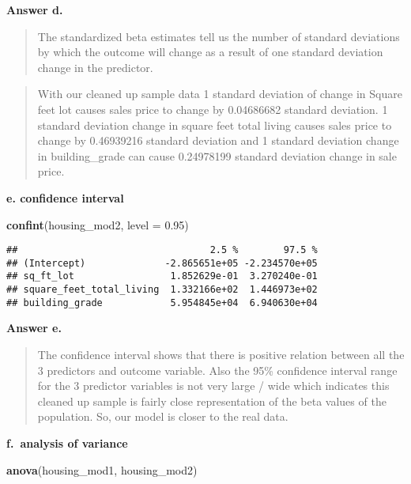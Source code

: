 \documentclass[
]{article}
\newenvironment{Shaded}{\begin{snugshade}}{\end{snugshade}}
\newcommand{\DataTypeTok}[1]{\textcolor[rgb]{0.13,0.29,0.53}{#1}}
\newcommand{\FloatTok}[1]{\textcolor[rgb]{0.00,0.00,0.81}{#1}}
\newcommand{\KeywordTok}[1]{\textcolor[rgb]{0.13,0.29,0.53}{\textbf{#1}}}
\newcommand{\NormalTok}[1]{#1}
\begin{document}
\textbf{Answer d.~}

\begin{quote}
The standardized beta estimates tell us the number of standard
deviations by which the outcome will change as a result of one standard
deviation change in the predictor.
\end{quote}

\begin{quote}
With our cleaned up sample data 1 standard deviation of change in Square
feet lot causes sales price to change by 0.04686682 standard deviation.
1 standard deviation change in square feet total living causes sales
price to change by 0.46939216 standard deviation and 1 standard
deviation change in building\_grade can cause 0.24978199 standard
deviation change in sale price.
\end{quote}

\textbf{e. confidence interval }

\begin{Shaded}
\begin{Highlighting}[]
\KeywordTok{confint}\NormalTok{(housing_mod2, }\DataTypeTok{level =} \FloatTok{0.95}\NormalTok{)}
\end{Highlighting}
\end{Shaded}

\begin{verbatim}
##                                  2.5 %        97.5 %
## (Intercept)              -2.865651e+05 -2.234570e+05
## sq_ft_lot                 1.852629e-01  3.270240e-01
## square_feet_total_living  1.332166e+02  1.446973e+02
## building_grade            5.954845e+04  6.940630e+04
\end{verbatim}

\textbf{Answer e.}

\begin{quote}
The confidence interval shows that there is positive relation between
all the 3 predictors and outcome variable. Also the 95\% confidence
interval range for the 3 predictor variables is not very large / wide
which indicates this cleaned up sample is fairly close representation of
the beta values of the population. So, our model is closer to the real
data.
\end{quote}

\textbf{f.~analysis of variance }

\begin{Shaded}
\begin{Highlighting}[]
\KeywordTok{anova}\NormalTok{(housing_mod1, housing_mod2)}
\end{Highlighting}
\end{Shaded}
\end{document}
